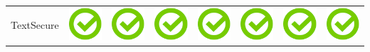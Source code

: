 \documentclass[10pt,foldmark,tumble]{leaflet}
\begin{document}
\begin{center}
{{\begin{tabular}{ L{2cm} | C{2cm} | C{2cm} | C{2cm} | C{2cm} | C{2cm} | C{2cm} | C{2cm} }
TextSecure & \includegraphics[scale=0.1]{pics/haken.png} & \includegraphics[scale=0.1]{pics/haken.png} & \includegraphics[scale=0.1]{pics/haken.png} & \includegraphics[scale=0.1]{pics/haken.png} & \includegraphics[scale=0.1]{pics/haken.png} & \includegraphics[scale=0.1]{pics/haken.png} & \includegraphics[scale=0.1]{pics/haken.png} \tabularnewline
\end{tabular}
} %
} %
\end{center}
 
\end{document}
